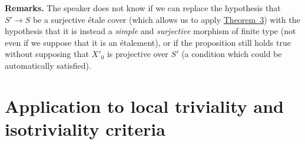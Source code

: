 \documentclass{article}
\newenvironment{rmenv}[1]
  {\phantomsection\par\medskip\noindent\textbf{#1.}\rmfamily}
  {\par\medskip}
\begin{document}
\begin{rmenv}{Remarks}
  The speaker does not know if we can replace the hypothesis that $S'\to S$ be a surjective \'{e}tale cover (which allows us to apply \hyperref[theorem:B.1(3)]{Theorem~3}) with the hypothesis that it is instead a \emph{simple} and \emph{surjective} morphism of finite type (not even if we suppose that it is an \'{e}talement), or if the proposition still holds true without supposing that $X'_0$ is projective over $S'$ (a condition which could be automatically satisfied).
\end{rmenv}


\section{Application to local triviality and isotriviality criteria}
\label{B.6}
\end{document}
